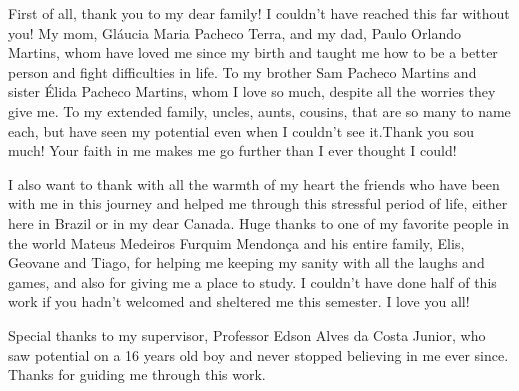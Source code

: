 \begin{agradecimentos}

First of all, thank you to my dear family! I couldn't have reached this far without you! My mom, Gl\'aucia Maria Pacheco Terra, and my dad, Paulo Orlando Martins, whom have loved me since my birth and taught me how to be a better person and fight difficulties in life. To my brother Sam Pacheco Martins and sister \'Elida Pacheco Martins, whom I love so much, despite all the worries they give me. To my extended family, uncles, aunts, cousins, that are so many to name each, but have seen my potential even when I couldn't see it.Thank you sou much! Your faith in me makes me go further than I ever thought I could!

I also want to thank with all the warmth of my heart the friends who have been with me in this journey and helped me through this stressful period of life, either here in Brazil or in my dear Canada. Huge thanks to one of my favorite people in the world Mateus Medeiros Furquim Mendon\c{c}a and his entire family, Elis, Geovane and Tiago, for helping me keeping my sanity with all the laughs and games, and also for giving me a place to study. I couldn't have done half of this work if you hadn't welcomed and sheltered me this semester. I love you all!

Special thanks to my supervisor, Professor Edson Alves da Costa Junior, who saw potential on a 16 years old boy and never stopped believing in me ever since. Thanks for guiding me through this work.

\end{agradecimentos}
